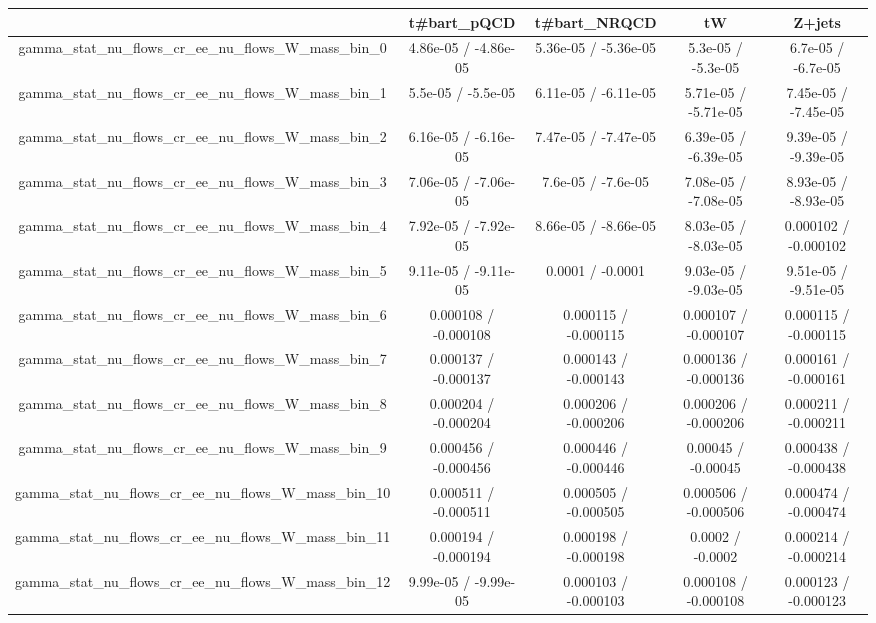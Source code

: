 \documentclass[10pt]{article}
\begin{document}
\begin{table}[htbp]
\begin{center}
\begin{tabular}{|c|c|c|c|c|}
\hline 
      & t#bar{t}_{pQCD}      & t#bar{t}_{NRQCD}      & tW      & Z+jets \\ 
\hline 
  gamma_stat_nu_flows_cr_ee_nu_flows_W_mass_bin_0 & 4.86e-05 / -4.86e-05 & 5.36e-05 / -5.36e-05 & 5.3e-05 / -5.3e-05 & 6.7e-05 / -6.7e-05 \\ 
  gamma_stat_nu_flows_cr_ee_nu_flows_W_mass_bin_1 & 5.5e-05 / -5.5e-05 & 6.11e-05 / -6.11e-05 & 5.71e-05 / -5.71e-05 & 7.45e-05 / -7.45e-05 \\ 
  gamma_stat_nu_flows_cr_ee_nu_flows_W_mass_bin_2 & 6.16e-05 / -6.16e-05 & 7.47e-05 / -7.47e-05 & 6.39e-05 / -6.39e-05 & 9.39e-05 / -9.39e-05 \\ 
  gamma_stat_nu_flows_cr_ee_nu_flows_W_mass_bin_3 & 7.06e-05 / -7.06e-05 & 7.6e-05 / -7.6e-05 & 7.08e-05 / -7.08e-05 & 8.93e-05 / -8.93e-05 \\ 
  gamma_stat_nu_flows_cr_ee_nu_flows_W_mass_bin_4 & 7.92e-05 / -7.92e-05 & 8.66e-05 / -8.66e-05 & 8.03e-05 / -8.03e-05 & 0.000102 / -0.000102 \\ 
  gamma_stat_nu_flows_cr_ee_nu_flows_W_mass_bin_5 & 9.11e-05 / -9.11e-05 & 0.0001 / -0.0001 & 9.03e-05 / -9.03e-05 & 9.51e-05 / -9.51e-05 \\ 
  gamma_stat_nu_flows_cr_ee_nu_flows_W_mass_bin_6 & 0.000108 / -0.000108 & 0.000115 / -0.000115 & 0.000107 / -0.000107 & 0.000115 / -0.000115 \\ 
  gamma_stat_nu_flows_cr_ee_nu_flows_W_mass_bin_7 & 0.000137 / -0.000137 & 0.000143 / -0.000143 & 0.000136 / -0.000136 & 0.000161 / -0.000161 \\ 
  gamma_stat_nu_flows_cr_ee_nu_flows_W_mass_bin_8 & 0.000204 / -0.000204 & 0.000206 / -0.000206 & 0.000206 / -0.000206 & 0.000211 / -0.000211 \\ 
  gamma_stat_nu_flows_cr_ee_nu_flows_W_mass_bin_9 & 0.000456 / -0.000456 & 0.000446 / -0.000446 & 0.00045 / -0.00045 & 0.000438 / -0.000438 \\ 
  gamma_stat_nu_flows_cr_ee_nu_flows_W_mass_bin_10 & 0.000511 / -0.000511 & 0.000505 / -0.000505 & 0.000506 / -0.000506 & 0.000474 / -0.000474 \\ 
  gamma_stat_nu_flows_cr_ee_nu_flows_W_mass_bin_11 & 0.000194 / -0.000194 & 0.000198 / -0.000198 & 0.0002 / -0.0002 & 0.000214 / -0.000214 \\ 
  gamma_stat_nu_flows_cr_ee_nu_flows_W_mass_bin_12 & 9.99e-05 / -9.99e-05 & 0.000103 / -0.000103 & 0.000108 / -0.000108 & 0.000123 / -0.000123 \\ 

\end{tabular}
\end{center}
\end{table}
\end{document}

